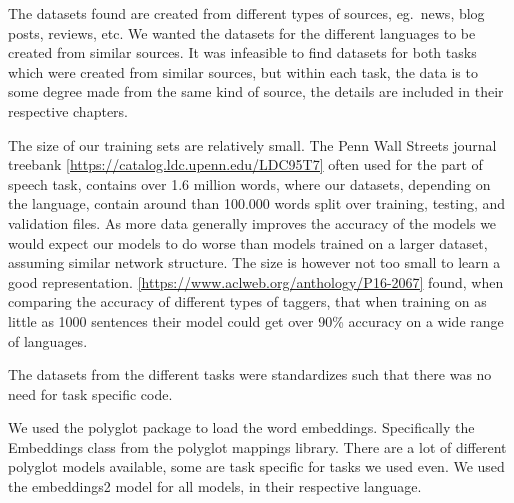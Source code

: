 The datasets found are created from different types of sources, eg.\ news, blog
posts, reviews, etc. We wanted the datasets for the different languages to be
created from similar sources. It was infeasible to find datasets for both tasks
which were created from similar sources, but within each task, the data is to
some degree made from the same kind of source, the details are included in their
respective chapters.

The size of our training sets are relatively small. The Penn Wall Streets
journal treebank \ref{https://catalog.ldc.upenn.edu/LDC95T7} often used for the
part of speech task, contains over 1.6 million words, where our datasets,
depending on the language, contain around than 100.000 words split over
training, testing, and validation files. As more data generally improves the
accuracy of the models we would expect our models to do worse than models
trained on a larger dataset, assuming similar network structure. The size is
however not too small to learn a good representation.
\ref{https://www.aclweb.org/anthology/P16-2067} found, when comparing the
accuracy of different types of taggers, that when training on as little as 1000
sentences their model could get over 90\% accuracy on a wide range of languages.


The datasets from the different tasks were standardizes such that there was no
need for task specific code. 

We used the polyglot package to load the word embeddings. Specifically the
Embeddings class from the polyglot mappings library. There are a lot of
different polyglot models available, some are task specific for tasks we used
even. We used the embeddings2 model for all models, in their respective
language. 

\pagebreak
